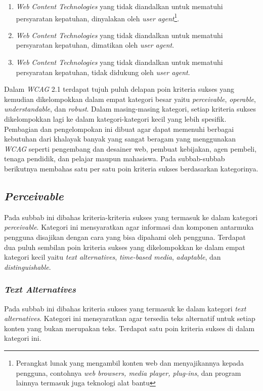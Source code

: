 \begin{itemize}
	\begin{enumerate}
		\item \textit{Web Content Technologies} yang tidak diandalkan untuk mematuhi persyaratan kepatuhan, dinyalakan oleh \textit{user agent}\footnote{Perangkat lunak yang mengambil konten web dan menyajikannya kepada pengguna, contohnya \textit{web browsers, media player, plug-ins}, dan program lainnya termasuk juga teknologi alat bantu}.
		\item \textit{Web Content Technologies} yang tidak diandalkan untuk mematuhi persyaratan kepatuhan, dimatikan oleh \textit{user agent}.
		\item \textit{Web Content Technologies} yang tidak diandalkan untuk mematuhi persyaratan kepatuhan, tidak didukung oleh \textit{user agent}.
	\end{enumerate}
\end{itemize}

Dalam \textit{WCAG} 2.1 terdapat tujuh puluh delapan poin kriteria sukses yang kemudian dikelompokkan dalam empat kategori besar yaitu \textit{perceivable}, \textit{operable}, \textit{understandable}, dan \textit{robust}. Dalam masing-masing kategori, setiap kriteria sukses dikelompokkan lagi ke dalam kategori-kategori kecil yang lebih spesifik. Pembagian dan pengelompokan ini dibuat agar dapat memenuhi berbagai kebutuhan dari khalayak banyak yang sangat beragam yang menggunakan \textit{WCAG} seperti pengembang dan desainer web, pembuat kebijakan, agen pembeli, tenaga pendidik, dan pelajar maupun mahasiswa. Pada subbab-subbab berikutnya membahas satu per satu poin kriteria sukses berdasarkan kategorinya.

\subsection{\textit{Perceivable}}
\label{sec:perceivable}
Pada subbab ini dibahas kriteria-kriteria sukses yang termasuk ke dalam kategori \textit{perceivable}. Kategori ini mensyaratkan agar informasi dan komponen antarmuka pengguna disajikan dengan cara yang bisa dipahami oleh pengguna. Terdapat dua puluh sembilan poin kriteria sukses yang dikelompokkan ke dalam empat kategori kecil yaitu \textit{text alternatives}, \textit{time-based media}, \textit{adaptable}, dan \textit{distinguishable}.

\subsubsection{\textit{Text Alternatives}}
\label{sec:text_alternatives}
Pada subbab ini dibahas kriteria sukses yang termasuk ke dalam kategori \textit{text alternatives}. Kategori ini mensyaratkan agar tersedia teks alternatif untuk setiap konten yang bukan merupakan teks. Terdapat satu poin kriteria sukses di dalam kategori ini.

